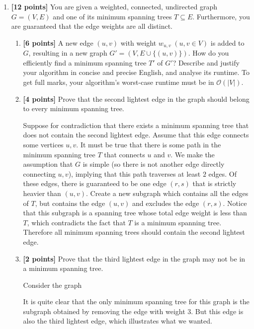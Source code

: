 \documentclass{assignment-263}
\begin{document}
\think
\begin{enumerate}
\item \textbf{[12 points]}
	You are given a weighted, connected, undirected graph $G=(V, E)$ and
    one of its minimum spanning trees $T\subseteq E$. Furthermore, you are guaranteed that the edge weights are all distinct.

    \begin{enumerate}
      \item \textbf{[6 points]}
        A new edge $(u, v)$ with weight $w_{u, v}\;(u, v\in V)$ is
        added to $G$, resulting in a new graph $G'=(V, E\cup \{(u,
        v)\})$. How do you efficiently find a minimum spanning tree
        $T'$ of $G'$? Describe and justify your algorithm in concise
        and precise English, and analyse its runtime. To get full
        marks, your algorithm's worst-case runtime must be in
        $\mathcal{O}(|V|)$.

      \item \textbf{[4 points]} Prove that the second lightest edge in the graph should belong to every minimum spanning tree.
      
      Suppose for contradiction that there exists a minimum spanning tree that does not contain the second lightest edge. Assume that this edge connects some vertices \(u,v\). It must be true that there is some path in the minimum spanning tree \(T\) that connects \(u\) and \(v\). We make the assumption that \(G\) is simple (so there is not another edge directly connecting \(u,v\)), implying that this path traverses at least \(2\) edges. Of these edges, there is guaranteed to be one edge \((r,s)\) that is strictly heavier than \((u,v)\). Create a new subgraph which contains all the edges of \(T\), but contains the edge \((u,v)\) and excludes the edge \((r,s)\). Notice that this subgraph is a spanning tree whose total edge weight is less than \(T\), which contradicts the fact that \(T\) is a minimum spanning tree. Therefore all minimum spanning trees should contain the second lightest edge.
      
      \item \textbf{[2 points]} Prove that the third lightest edge in the graph may not be in a minimum spanning tree.
      
      Consider the graph
      \begin{center}
        \centering
      \end{center}
      It is quite clear that the only minimum spanning tree for this graph is the subgraph obtained by removing the edge with weight 3. But this edge is also the third lightest edge, which illustrates what we wanted.
    \end{enumerate}

	\end{enumerate}
\end{document}
